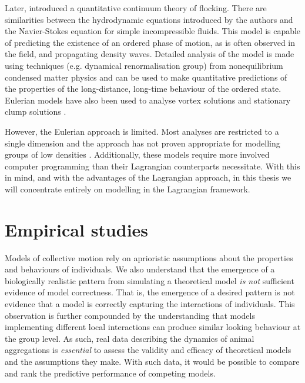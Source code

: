 Later, \textcite{toner98} introduced a quantitative continuum theory of
flocking. There are similarities between the hydrodynamic equations introduced
by the authors and the Navier-Stokes equation for simple incompressible fluids.
This model is capable of predicting the existence of an ordered phase of
motion, as is often observed in the field, and propagating density waves.
Detailed analysis of the model is made using techniques (e.g. dynamical
renormalisation group) from nonequilibrium condensed matter physics and can be
used to make quantitative predictions of the properties of the long-distance,
long-time behaviour of the ordered state. Eulerian models have also been used
to analyse vortex solutions \parencite{topaz04} and stationary clump solutions
\parencite{topaz06}.

However, the Eulerian approach is limited. Most analyses are restricted to a
single dimension and the approach has not proven appropriate for modelling
groups of low densities \parencite{giardina08}. Additionally, these models
require more involved computer programming than their Lagrangian counterparts
necessitate. With this in mind, and with the advantages of the Lagrangian
approach, in this thesis we will concentrate entirely on modelling in the
Lagrangian framework.

\section{Empirical studies}
\label{sec:empirical_studies}

Models of collective motion rely on aprioristic assumptions about the properties
and behaviours of individuals. We also understand that the emergence of a
biologically realistic pattern from simulating a theoretical model \emph{is
not} sufficient evidence of model correctness. That is, the emergence of a
desired pattern is not evidence that a model is correctly capturing the
interactions of individuals. This observation is further compounded by the
understanding that models implementing different local interactions can produce
similar looking behaviour at the group level. As such, real data describing the
dynamics of animal aggregations is \emph{essential} to assess the validity and
efficacy of theoretical models and the assumptions they make. With such data,
it would be possible to compare and rank the predictive performance of
competing models.

